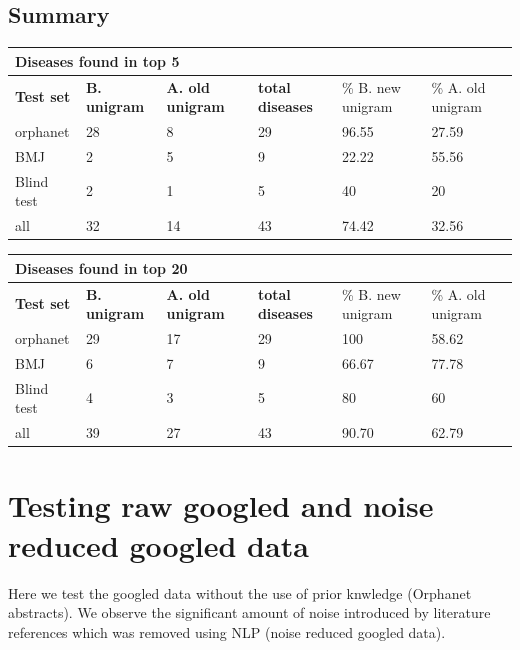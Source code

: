 \documentclass[10pt,letterpaper,two column,final]{article}
\begin{document}
\subsection{Summary}
\label{app:summary_old_new}

\begin{center}
\begin{small}
\begin{tabular}{l|p{2.2cm}p{2.2cm}||p{1.2cm}p{2.2cm}p{2.2cm}}
	\multicolumn{6}{l}{\textbf{Diseases found in top 5}} \\ \hline
\textbf{Test set} & \textbf{B. unigram} &	\textbf{A. old unigram}	 &	\textbf{total diseases} &	\% B. new unigram	 &\% A. old unigram \\ \hline
orphanet &	28 &	8	 &	29 &	96.55 &	27.59 \\
BMJ	& 2 &	5	 &	9	 & 22.22 &	55.56 \\
Blind test	& 2 &	1	 &	5 &	40	 &20 \\ \hline \hline
all	& 32 &	14	 &	43 &	74.42 &	32.56 \\ \hline
\end{tabular}
\end{small}
\end{center}

\begin{center}
\begin{small}
\begin{tabular}{l|p{2.2cm}p{2.2cm}||p{1.2cm}p{2.2cm}p{2.2cm}}
	\multicolumn{6}{l}{\textbf{Diseases found in top 20}} \\ \hline
\textbf{Test set} & \textbf{B. unigram} &	\textbf{A. old unigram}	 &	\textbf{total diseases} &	\% B. new unigram	 &\% A. old unigram \\ \hline
orphanet &	29 &	17	 &	29 &	100	 & 58.62 \\
BMJ &	6 &	7 &		9 &	66.67 &	77.78 \\
Blind test &	4	 &3	 &	5 &	80	 &60 \\  \hline \hline
all	 &39	 &27 &		43 &	90.70 &	62.79\\ \hline
\end{tabular}
\end{small}
\end{center}

\newpage
\section{Testing raw googled and noise reduced googled data}
Here we test the googled data without the use of prior knwledge (Orphanet abstracts). We observe the significant amount of noise introduced by literature references which was removed using NLP (noise reduced googled data). 
\label{app:tests_raw_reduced}
\end{document}

